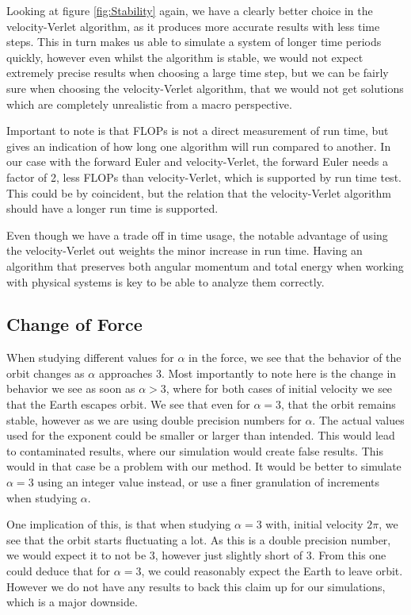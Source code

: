\documentclass[%
reprint,
nofootinbib,
amsmath,amssymb,
aps,
]{revtex4-1}
\begin{document}
Looking at figure \ref{fig:Stability} again, we have a clearly better choice in the velocity-Verlet algorithm, as it produces more accurate results with less time steps. This in turn makes us able to simulate a system of longer time periods quickly, however even whilst the algorithm is stable, we would not expect extremely precise results when choosing a large time step, but we can be fairly sure when choosing the velocity-Verlet algorithm, that we would not get solutions which are completely unrealistic from a macro perspective. 

Important to note is that FLOPs is not a direct measurement of run time, but gives an indication of how long one algorithm will run compared to another. In our case with the forward Euler and velocity-Verlet, the forward Euler needs a factor of 2, less FLOPs than velocity-Verlet, which is supported by run time test. This could be by coincident, but the relation that the velocity-Verlet algorithm should have a longer run time is supported. 

Even though we have a trade off in time usage, the notable advantage of using the velocity-Verlet out weights the minor increase in run time. Having an algorithm that preserves both angular momentum and total energy when working with physical systems is key to be able to analyze them correctly. 

\subsection{Change of Force} %
When studying different values for $\alpha$ in the force, we see that the behavior of the orbit changes as $\alpha$ approaches 3. Most importantly to note here is the change in behavior we see as soon as $\alpha > 3$, where for both cases of initial velocity we see that the Earth escapes orbit. We see that even for $\alpha = 3$, that the orbit remains stable, however as we are using double precision numbers for $\alpha$. The actual values used for the exponent could be smaller or larger than intended. This would lead to contaminated results, where our simulation would create false results. This would in that case be a problem with our method. 
It would be better to simulate $\alpha = 3$ using an integer value instead, or use a finer granulation of increments when studying $\alpha$. 

One implication of this, is that when studying $\alpha = 3$ with, initial velocity $2\pi$, we see that the orbit starts fluctuating a lot. As this is a double precision number, we would expect it to not be $3$, however just slightly short of 3. 
From this one could deduce that for $\alpha = 3$, we could reasonably expect the Earth to leave orbit. However we do not have any results to back this claim up for our simulations, which is a major downside. 
\end{document}
